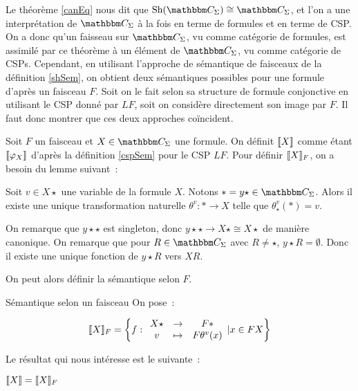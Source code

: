 Le théorème \ref{canEq} nous dit que $\sh(\C_\Sigma)\cong \C_\Sigma$, et l'on a
une interprétation de $\C_\Sigma$ à la fois en terme de formules et en terme de
CSP.  On a donc qu'un faisseau sur $\C_\Sigma$, vu comme catégorie de formules,
est assimilé par ce théorème à un élément de $\C_\Sigma$, vu comme catégorie de
CSPs.  Cependant, en utilisant l'approche de sémantique de faisceaux de la
définition \ref{shSem}, on obtient deux sémantiques possibles pour une formule
d'après un faisceau $F$.  Soit on le fait selon sa structure de formule
conjonctive en utilisant le CSP donné par $LF$, soit on considère directement
son image par $F$. Il faut donc montrer que ces deux approches coïncident.

Soit $F$ un faisceau et $X\in\C_\Sigma$ une formule. On définit $\llbracket {X} \rrbracket$ comme
étant $\llbracket {\varphi_X} \rrbracket$ d'après la définition \ref{cspSem} pour le CSP $LF$. Pour
définir $\llbracket {X} \rrbracket_F$, on a besoin du lemme suivant~:

\begin{lem}
    Soit $v\in X\star$ une variable de la formule $X$. Notons
    $\ast = y\star\in\C_\Sigma$. Alors il existe une unique transformation naturelle
    $\theta^v : \ast\rightarrow X$ telle que $\theta^v_\star(*) = v$.
\end{lem}

\begin{pv}
    On remarque que $y\star\star$ est singleton, donc
    $y\star\star\rightarrow X\star\cong X\star$ de manière canonique. On remarque que pour
    $R\in\C_\Sigma$ avec $R\neq\star$, $y\star R=\emptyset$. Donc il existe une unique
    fonction de $y\star R$ vers $X R$. 
\end{pv}

On peut alors définir la sémantique selon $F$.

\begin{defi}{Sémantique selon un faisceau}
    On pose~:

    \[\llbracket {X} \rrbracket_F = \left\{f:\begin{array}{ccc}
        X\star & \rightarrow & F\ast \\
        v      & \mapsto     & F\theta^v(x)
    \end{array} | x\in F X\right\}\]
\end{defi}

Le résultat qui nous intéresse est le suivante~:

\begin{prop}\label{shSemCorrect2}
    $\llbracket {X} \rrbracket = \llbracket {X} \rrbracket_F$
\end{prop}

